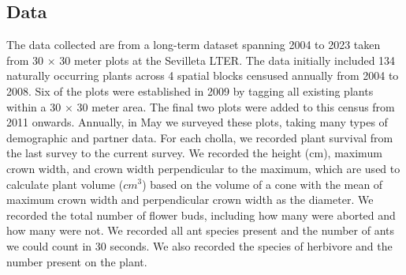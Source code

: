\documentclass[11pt]{article}\usepackage[sc]{mathpazo} %
\begin{document}
	\subsection*{Data}
The data collected are from a long-term dataset spanning 2004 to 2023 taken from 30 $\times$ 30 meter plots at the Sevilleta LTER. 
The data initially included 134 naturally occurring plants across 4 spatial blocks censused annually from 2004 to 2008.
Six of the plots were established in 2009 by tagging all existing plants within a 30 $\times$ 30 meter area. 
The final two plots were added to this census from 2011 onwards. 
Annually, in May we surveyed these plots, taking many types of demographic and partner data. 
For each cholla, we recorded plant survival from the last survey to the current survey. 
We recorded the height (cm), maximum crown width, and crown width perpendicular to the maximum, which are used to calculate plant volume ($cm^3$) based on the volume of a cone with the mean of maximum crown width and perpendicular crown width as the diameter. 
We recorded the total number of flower buds, including how many were aborted and how many were not. We recorded all ant species present and the number of ants we could count in 30 seconds. 
We also recorded the species of herbivore and the number present on the plant.
		
\end{document}
